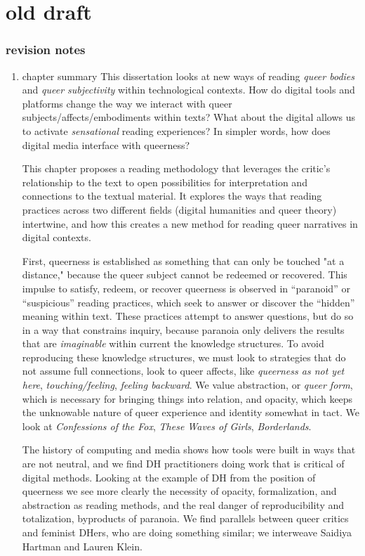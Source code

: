 \documentclass[11pt]{article}
\begin{document}
\section{old draft}
\label{sec:org6c9cbb0}

\subsubsection{revision notes}
\label{sec:org2b38d4c}
\begin{enumerate}
\item chapter summary
\label{sec:orge4df156}
This dissertation looks at new ways of reading \emph{queer bodies} and
\emph{queer subjectivity} within technological contexts. How do digital
tools and platforms change the way we interact with queer
subjects/affects/embodiments within texts? What about the digital
allows us to activate \emph{sensational} reading experiences? In simpler
words, how does digital media interface with queerness?

This chapter proposes a reading methodology that leverages the
critic's relationship to the text to open possibilities for
interpretation and connections to the textual material. It explores
the ways that reading practices across two different fields (digital
humanities and queer theory) intertwine, and how this creates a new
method for reading queer narratives in digital contexts.

First, queerness is established as something that can only be touched
"at a distance," because the queer subject cannot be redeemed or
recovered. This impulse to satisfy, redeem, or recover queerness is
observed in “paranoid” or “suspicious” reading practices, which seek
to answer or discover the “hidden” meaning within text. These
practices attempt to answer questions, but do so in a way that
constrains inquiry, because paranoia only delivers the results that
are \emph{imaginable} within current the knowledge structures. To avoid
reproducing these knowledge structures, we must look to strategies
that do not assume full connections, look to queer affects, like
\emph{queerness as not yet here}, \emph{touching/feeling}, \emph{feeling
backward}. We value abstraction, or \emph{queer form}, which is necessary
for bringing things into relation, and opacity, which keeps the
unknowable nature of queer experience and identity somewhat in
tact. We look at \emph{Confessions of the Fox}, \emph{These Waves of Girls},
\emph{Borderlands}.

The history of computing and media shows how tools were built in ways
that are not neutral, and we find DH practitioners doing work that is
critical of digital methods. Looking at the example of DH from the
position of queerness we see more clearly the necessity of opacity,
formalization, and abstraction as reading methods, and the real danger
of reproducibility and totalization, byproducts of paranoia. We find
parallels between queer critics and feminist DHers, who are doing
something similar; we interweave Saidiya Hartman and Lauren Klein.


\end{enumerate}
\end{document}
